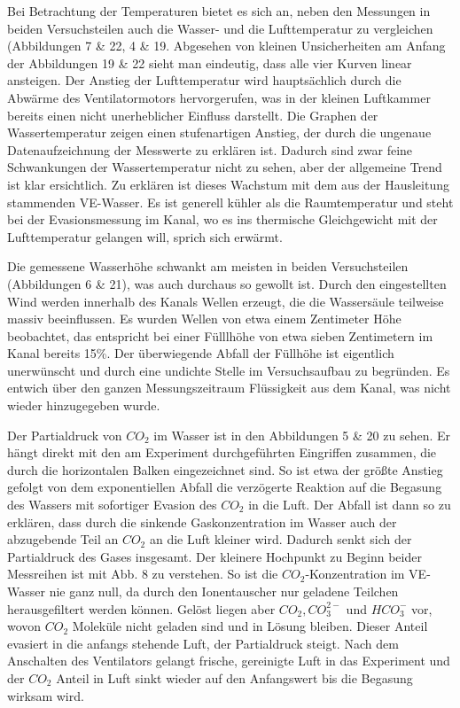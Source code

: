 \documentclass[12pt]{article}
\begin{document}
Bei Betrachtung der Temperaturen bietet es sich an, neben den Messungen in beiden Versuchsteilen auch die Wasser- und die Lufttemperatur zu vergleichen (Abbildungen 7 \& 22, 4 \& 19. Abgesehen von kleinen Unsicherheiten am Anfang der Abbildungen 19 \& 22 sieht man eindeutig, dass alle vier Kurven linear ansteigen.
Der Anstieg der Lufttemperatur wird hauptsächlich durch die Abwärme des Ventilatormotors hervorgerufen, was in der kleinen Luftkammer bereits einen nicht unerheblicher Einfluss darstellt.
Die Graphen der Wassertemperatur zeigen einen stufenartigen Anstieg, der durch die ungenaue Datenaufzeichnung der Messwerte zu erklären ist. Dadurch sind zwar feine Schwankungen der Wassertemperatur nicht zu sehen, aber der allgemeine Trend ist klar ersichtlich. Zu erklären ist dieses Wachstum mit dem aus der Hausleitung stammenden VE-Wasser. Es ist generell kühler als die Raumtemperatur und steht bei der Evasionsmessung im Kanal, wo es ins thermische Gleichgewicht mit der Lufttemperatur gelangen will, sprich sich erwärmt. 

Die gemessene Wasserhöhe schwankt am meisten in beiden Versuchsteilen (Abbildungen 6 & 21), was auch durchaus so gewollt ist. Durch den eingestellten Wind werden innerhalb des Kanals Wellen erzeugt, die die Wassersäule teilweise massiv beeinflussen. Es wurden Wellen von etwa einem Zentimeter Höhe beobachtet, das entspricht bei einer Fülllhöhe von etwa sieben Zentimetern im Kanal bereits 15\%. Der überwiegende Abfall der Füllhöhe ist eigentlich unerwünscht und durch eine undichte Stelle im Versuchsaufbau zu begründen. Es entwich über den ganzen Messungszeitraum Flüssigkeit aus dem Kanal, was nicht wieder hinzugegeben wurde.

Der Partialdruck von $CO_2$ im Wasser ist in den Abbildungen 5 \& 20 zu sehen. Er hängt direkt mit den am Experiment durchgeführten Eingriffen zusammen, die durch die horizontalen Balken eingezeichnet sind. So ist etwa der größte Anstieg gefolgt von dem exponentiellen Abfall die verzögerte Reaktion auf die Begasung des Wassers mit sofortiger Evasion des $CO_2$ in die Luft. Der Abfall ist dann so zu erklären, dass durch die sinkende Gaskonzentration im Wasser auch der abzugebende Teil an $CO_2$ an die Luft kleiner wird. Dadurch senkt sich der Partialdruck des Gases insgesamt.
Der kleinere Hochpunkt zu Beginn beider Messreihen ist mit \cite{jaehne} Abb. 8
zu verstehen. So ist die $CO_2$-Konzentration im VE-Wasser nie ganz null, da durch den Ionentauscher nur geladene Teilchen herausgefiltert werden können. Gelöst liegen aber $CO_2, CO_3^{2-} $ und $HCO_3^-$ vor, wovon $CO_2$ Moleküle nicht geladen sind und in Lösung bleiben.
Dieser Anteil evasiert in die anfangs stehende Luft, der Partialdruck steigt. Nach dem Anschalten des Ventilators gelangt frische, gereinigte Luft in das Experiment und der $CO_2$ Anteil in Luft sinkt wieder auf den Anfangswert bis die Begasung wirksam wird.
\end{document}
